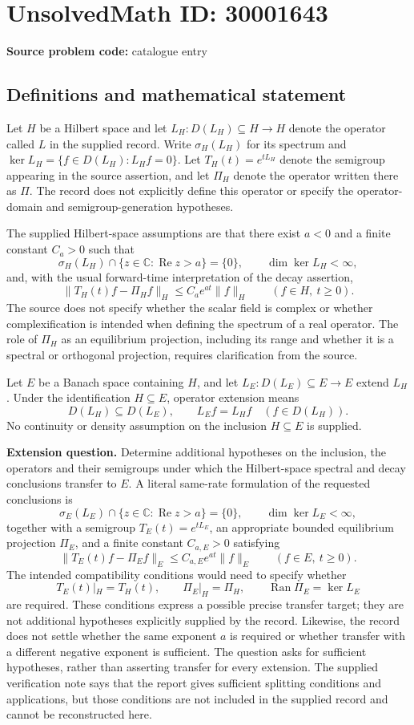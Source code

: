 \documentclass[11pt]{article}
\newcommand{\C}{\mathbb{C}}
\begin{document}
\section*{UnsolvedMath ID: 30001643}
\textbf{Source problem code:} catalogue entry
\subsection{Definitions and mathematical statement}
Let \(H\) be a Hilbert space and let \(L_H:D(L_H)\subseteq H\to H\) denote the operator called \(L\) in the supplied record. Write \(\sigma_H(L_H)\) for its spectrum and \(\ker L_H=\{f\in D(L_H):L_Hf=0\}\). Let \(T_H(t)=e^{tL_H}\) denote the semigroup appearing in the source assertion, and let \(\Pi_H\) denote the operator written there as \(\Pi\). The record does not explicitly define this operator or specify the operator-domain and semigroup-generation hypotheses.

The supplied Hilbert-space assumptions are that there exist \(a<0\) and a finite constant \(C_a>0\) such that
\[
\sigma_H(L_H)\cap\{z\in\C:\operatorname{Re}z>a\}=\{0\},
\qquad \dim\ker L_H<\infty,
\]
and, with the usual forward-time interpretation of the decay assertion,
\[
\|T_H(t)f-\Pi_Hf\|_H\leq C_a e^{at}\|f\|_H
\qquad(f\in H,\ t\geq0).
\]
The source does not specify whether the scalar field is complex or whether complexification is intended when defining the spectrum of a real operator. The role of \(\Pi_H\) as an equilibrium projection, including its range and whether it is a spectral or orthogonal projection, requires clarification from the source.

Let \(E\) be a Banach space containing \(H\), and let \(L_E:D(L_E)\subseteq E\to E\) extend \(L_H\). Under the identification \(H\subseteq E\), operator extension means
\[
D(L_H)\subseteq D(L_E),\qquad L_Ef=L_Hf\quad(f\in D(L_H)).
\]
No continuity or density assumption on the inclusion \(H\subseteq E\) is supplied.

\textbf{Extension question.} Determine additional hypotheses on the inclusion, the operators and their semigroups under which the Hilbert-space spectral and decay conclusions transfer to \(E\). A literal same-rate formulation of the requested conclusions is
\[
\sigma_E(L_E)\cap\{z\in\C:\operatorname{Re}z>a\}=\{0\},
\qquad \dim\ker L_E<\infty,
\]
together with a semigroup \(T_E(t)=e^{tL_E}\), an appropriate bounded equilibrium projection \(\Pi_E\), and a finite constant \(C_{a,E}>0\) satisfying
\[
\|T_E(t)f-\Pi_Ef\|_E\leq C_{a,E}e^{at}\|f\|_E
\qquad(f\in E,\ t\geq0).
\]
The intended compatibility conditions would need to specify whether
\[
T_E(t)|_H=T_H(t),\qquad \Pi_E|_H=\Pi_H,
\qquad \operatorname{Ran}\Pi_E=\ker L_E
\]
are required. These conditions express a possible precise transfer target; they are not additional hypotheses explicitly supplied by the record. Likewise, the record does not settle whether the same exponent \(a\) is required or whether transfer with a different negative exponent is sufficient. The question asks for sufficient hypotheses, rather than asserting transfer for every extension. The supplied verification note says that the report gives sufficient splitting conditions and applications, but those conditions are not included in the supplied record and cannot be reconstructed here.
\end{document}
